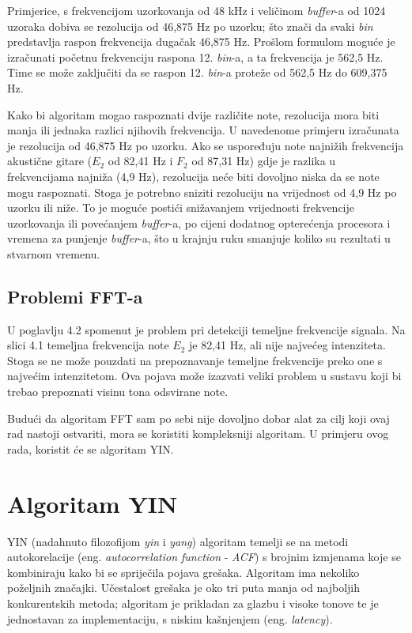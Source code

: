 \documentclass[times, utf8, zavrsni, numeric]{fer}
\begin{document}
Primjerice, s frekvencijom uzorkovanja od 48 kHz i veličinom \textit{buffer}-a od 1024 uzoraka dobiva se rezolucija od 46,875 Hz po uzorku; što znači da svaki \textit{bin} predstavlja raspon frekvencija dugačak 46,875 Hz. Prošlom formulom moguće je izračunati početnu frekvenciju raspona 12. \textit{bin}-a, a ta frekvencija je 562,5 Hz. Time se može zaključiti da se raspon 12. \textit{bin}-a proteže od 562,5 Hz do 609,375 Hz.

Kako bi algoritam mogao raspoznati dvije različite note, rezolucija mora biti manja ili jednaka razlici njihovih frekvencija.
U navedenome primjeru izračunata je rezolucija od 46,875 Hz po uzorku. Ako se uspoređuju note najnižih frekvencija akustične gitare ($E_2$ od 82,41 Hz i $F_2$ od 87,31 Hz) gdje je razlika u frekvencijama najniža (4,9 Hz), rezolucija neće biti dovoljno niska da se note mogu raspoznati. Stoga je potrebno sniziti rezoluciju na vrijednost od 4,9 Hz po uzorku ili niže. To je moguće postići snižavanjem vrijednosti frekvencije uzorkovanja ili povećanjem \textit{buffer}-a, po cijeni dodatnog opterećenja procesora i vremena za punjenje \textit{buffer}-a, što u krajnju ruku smanjuje koliko su rezultati u stvarnom vremenu.

\section{Problemi FFT-a}
U poglavlju 4.2 spomenut je problem pri detekciji temeljne frekvencije signala. Na slici 4.1 temeljna frekvencija note $E_2$ je 82,41 Hz, ali nije najvećeg intenziteta. Stoga se ne može pouzdati na prepoznavanje temeljne frekvencije preko one s najvećim intenzitetom. Ova pojava može izazvati veliki problem u sustavu koji bi trebao prepoznati visinu tona odsvirane note.

Budući da algoritam FFT sam po sebi nije dovoljno dobar alat za cilj koji ovaj rad nastoji ostvariti, mora se koristiti kompleksniji algoritam. U primjeru ovog rada, koristit će se algoritam YIN.

\chapter{Algoritam YIN}
YIN (nadahnuto filozofijom \textit{yin} i \textit{yang}) algoritam temelji se na metodi autokorelacije (eng. \textit{autocorrelation function} - \textit{ACF}) s brojnim izmjenama koje se kombiniraju kako bi se spriječila pojava grešaka. Algoritam ima nekoliko poželjnih značajki. Učestalost grešaka je oko tri puta manja od najboljih konkurentskih metoda; algoritam je prikladan za glazbu i visoke tonove te je jednostavan za implementaciju, s niskim kašnjenjem (eng. \textit{latency}).\cite{de2002yin}
\end{document}
